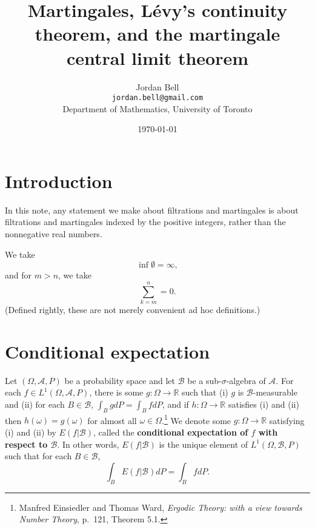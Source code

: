 \documentclass{article}
\theoremstyle{definition}
\begin{document}
\title{Martingales, L\'evy's continuity theorem, and the martingale central limit theorem}
\author{Jordan Bell\\ \texttt{jordan.bell@gmail.com}\\Department of Mathematics, University of Toronto}
\date{\today}

\maketitle


\section{Introduction}
In this note, any statement we make about filtrations and martingales is about filtrations and martingales indexed by the positive integers,
rather than the nonnegative real numbers.

We take
\[
\inf \emptyset = \infty,
\]
and for $m>n$, we take
\[
\sum_{k=m}^n = 0.
\]
(Defined rightly, these are not merely convenient  ad hoc definitions.)


\section{Conditional expectation}
Let $(\Omega,\mathscr{A},P)$ be a probability space and let
$\mathscr{B}$ be a sub-$\sigma$-algebra of $\mathscr{A}$. 
For each $f \in L^1(\Omega,\mathscr{A},P)$, there is some
$g:\Omega \to \mathbb{R}$ such that
(i) $g$ is $\mathscr{B}$-measurable and (ii) for each $B \in \mathscr{B}$,
$\int_B g dP = \int_B f dP$, and if $h:\Omega \to \mathbb{R}$ satisfies (i) and (ii) then
$h(\omega)=g(\omega)$ for almost all $\omega \in \Omega$.\footnote{Manfred Einsiedler and Thomas Ward,
{\em Ergodic Theory: with a view towards Number Theory}, p.~121, Theorem 5.1.}
We denote some $g:\Omega \to \mathbb{R}$ satisfying (i) and (ii) by $E(f|\mathscr{B})$, called
the \textbf{conditional expectation of $f$ with respect to $\mathscr{B}$}.
In other words,
$E(f|\mathscr{B})$ is the unique element of $L^1(\Omega,\mathscr{B},P)$
such that for each $B \in \mathscr{B}$,
\[
\int_B E(f|\mathscr{B}) dP = \int_B f dP.
\] 
\end{document}
